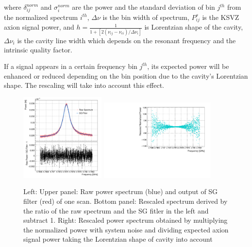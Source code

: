 where $\delta_{ij}^{norm}$ and $\sigma_{i}^{norm}$ are the power and the standard deviation of
bin $j^{th}$ from the normalized spectrum $i^{th}$,
$\Delta\nu$ is the bin width of spectrum, $P_{ij}^{s}$ is the KSVZ axion signal power,
and $h = \frac{1}{1 + [2(\nu_{ij} - \nu_{ci})/\Delta\nu_{i}]}$ is Lorentzian shape of the cavity,
$\Delta\nu_{i}$ is the cavity line width which depends on the resonant frequency and the intrinsic quality factor.

If a signal appears in a certain frequency bin $j^{th}$, its expected power will be enhanced or reduced depending on the bin position due to the cavity's Lorentzian shape. The rescaling will take into account this effect.

\begin{figure} [htbp]
  \centering
  \includegraphics[width=0.38\textwidth,height = 0.4\textwidth]{figures/RawPower_SGPower_Ratio_vs_Freq_Step_0100.png}
  \includegraphics[width=0.52\textwidth,height = 0.4\textwidth]{figures/RescaledPower_vs_Freq_Step_0100.pdf}
  \caption{Left: Upper panel: Raw power spectrum (blue) and output of SG filter (red) of one scan. Bottom panel: Rescaled spectrum derived by the ratio of the raw spectrum and the SG fitler in the left and subtract 1.
  Right: Rescaled power spectrum obtained by multiplying the normalized power with system noise and dividing expected axion signal power taking the Lorentzian shape of cavity into account}
  \label{fig:raw_sg_power}
\end{figure}

